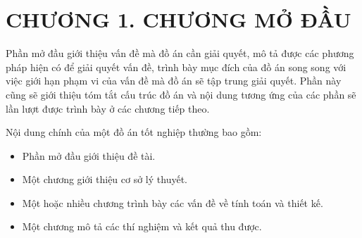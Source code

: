 \section*{CHƯƠNG 1.  CHƯƠNG MỞ ĐẦU}
Phần mở đầu giới thiệu vấn đề mà đồ án cần giải quyết, mô tả được các phương pháp hiện có để giải quyết vấn đề, trình bày mục đích của đồ án song song với việc giới hạn phạm vi của vấn đề mà đồ án sẽ tập trung giải quyết. Phần này cũng sẽ giới thiệu tóm tắt cấu trúc đồ án và nội dung tương ứng của các phần sẽ lần lượt được trình bày ở các chương tiếp theo.

Nội dung chính của một đồ án tốt nghiệp thường bao gồm:
\begin{itemize}
    \item Phần mở đầu giới thiệu đề tài.
    \item Một chương giới thiệu cơ sở lý thuyết.
    \item Một hoặc nhiều chương trình bày các vấn đề về tính toán và thiết kế.
    \item Một chương mô tả các thí nghiệm và kết quả thu được.
\end{itemize}
\newpage